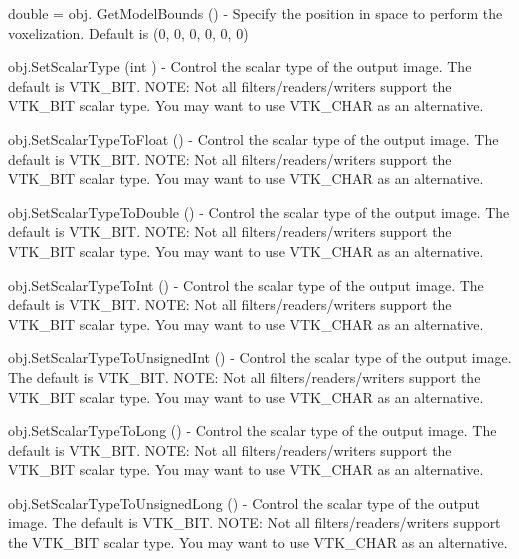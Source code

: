 \begin{DoxyItemize}
\item {\ttfamily double = obj. Get\-Model\-Bounds ()} -\/ Specify the position in space to perform the voxelization. Default is (0, 0, 0, 0, 0, 0)  
\item {\ttfamily obj.\-Set\-Scalar\-Type (int )} -\/ Control the scalar type of the output image. The default is V\-T\-K\-\_\-\-B\-I\-T. N\-O\-T\-E\-: Not all filters/readers/writers support the V\-T\-K\-\_\-\-B\-I\-T scalar type. You may want to use V\-T\-K\-\_\-\-C\-H\-A\-R as an alternative.  
\item {\ttfamily obj.\-Set\-Scalar\-Type\-To\-Float ()} -\/ Control the scalar type of the output image. The default is V\-T\-K\-\_\-\-B\-I\-T. N\-O\-T\-E\-: Not all filters/readers/writers support the V\-T\-K\-\_\-\-B\-I\-T scalar type. You may want to use V\-T\-K\-\_\-\-C\-H\-A\-R as an alternative.  
\item {\ttfamily obj.\-Set\-Scalar\-Type\-To\-Double ()} -\/ Control the scalar type of the output image. The default is V\-T\-K\-\_\-\-B\-I\-T. N\-O\-T\-E\-: Not all filters/readers/writers support the V\-T\-K\-\_\-\-B\-I\-T scalar type. You may want to use V\-T\-K\-\_\-\-C\-H\-A\-R as an alternative.  
\item {\ttfamily obj.\-Set\-Scalar\-Type\-To\-Int ()} -\/ Control the scalar type of the output image. The default is V\-T\-K\-\_\-\-B\-I\-T. N\-O\-T\-E\-: Not all filters/readers/writers support the V\-T\-K\-\_\-\-B\-I\-T scalar type. You may want to use V\-T\-K\-\_\-\-C\-H\-A\-R as an alternative.  
\item {\ttfamily obj.\-Set\-Scalar\-Type\-To\-Unsigned\-Int ()} -\/ Control the scalar type of the output image. The default is V\-T\-K\-\_\-\-B\-I\-T. N\-O\-T\-E\-: Not all filters/readers/writers support the V\-T\-K\-\_\-\-B\-I\-T scalar type. You may want to use V\-T\-K\-\_\-\-C\-H\-A\-R as an alternative.  
\item {\ttfamily obj.\-Set\-Scalar\-Type\-To\-Long ()} -\/ Control the scalar type of the output image. The default is V\-T\-K\-\_\-\-B\-I\-T. N\-O\-T\-E\-: Not all filters/readers/writers support the V\-T\-K\-\_\-\-B\-I\-T scalar type. You may want to use V\-T\-K\-\_\-\-C\-H\-A\-R as an alternative.  
\item {\ttfamily obj.\-Set\-Scalar\-Type\-To\-Unsigned\-Long ()} -\/ Control the scalar type of the output image. The default is V\-T\-K\-\_\-\-B\-I\-T. N\-O\-T\-E\-: Not all filters/readers/writers support the V\-T\-K\-\_\-\-B\-I\-T scalar type. You may want to use V\-T\-K\-\_\-\-C\-H\-A\-R as an alternative.  

\end{DoxyItemize}
